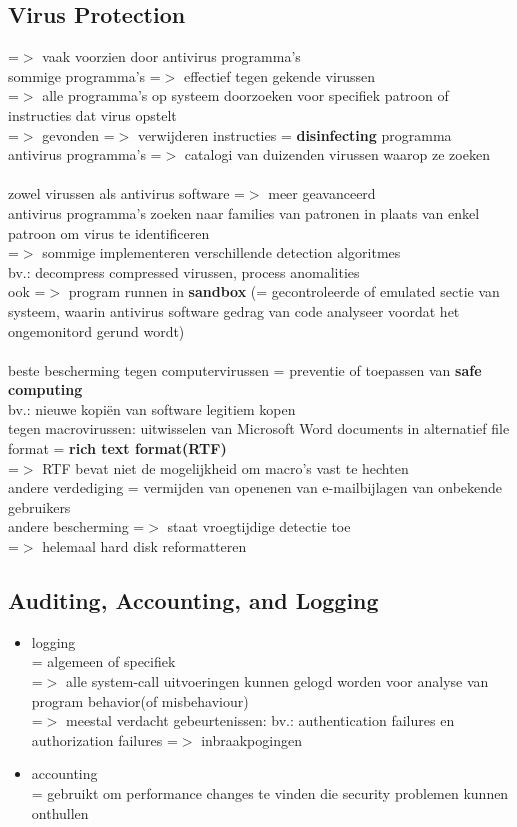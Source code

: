 \documentclass{report}
\begin{document}
\subsection{Virus Protection}
=$>$ vaak voorzien door antivirus programma's 
\\sommige programma's =$>$ effectief tegen gekende virussen
\\=$>$ alle programma's op systeem doorzoeken voor specifiek patroon of instructies dat virus opstelt
\\=$>$ gevonden =$>$ verwijderen instructies = \textbf{disinfecting} programma
\\antivirus programma's =$>$ catalogi van duizenden virussen waarop ze zoeken
\\
\\zowel virussen als antivirus software =$>$ meer geavanceerd
\\antivirus programma's zoeken naar families van patronen in plaats van enkel patroon om virus te identificeren
\\=$>$ sommige implementeren verschillende detection algoritmes
\\bv.: decompress compressed virussen, process anomalities
\\ook =$>$ program runnen in \textbf{sandbox} (= gecontroleerde of emulated sectie van systeem, waarin antivirus software gedrag van code analyseer voordat het ongemonitord gerund wordt)
\\
\\beste bescherming tegen computervirussen = preventie of toepassen van \textbf{safe computing}
\\bv.: nieuwe kopiën van software legitiem kopen
\\tegen macrovirussen: uitwisselen van Microsoft Word documents in alternatief file format = \textbf{rich text format(RTF)}
\\=$>$ RTF bevat niet de mogelijkheid om macro's vast te hechten
\\andere verdediging = vermijden van openenen van e-mailbijlagen van onbekende gebruikers
\\andere bescherming =$>$ staat vroegtijdige detectie toe
\\=$>$ helemaal hard disk reformatteren

\subsection{Auditing, Accounting, and Logging}
\begin{itemize}
\item logging
\\= algemeen of specifiek
\\=$>$ alle system-call uitvoeringen kunnen gelogd worden voor analyse van program behavior(of misbehaviour)
\\=$>$ meestal verdacht gebeurtenissen: bv.: authentication failures en authorization failures =$>$ inbraakpogingen
\item accounting
\\= gebruikt om performance changes te vinden die security problemen kunnen onthullen
\end{itemize}
\end{document}
